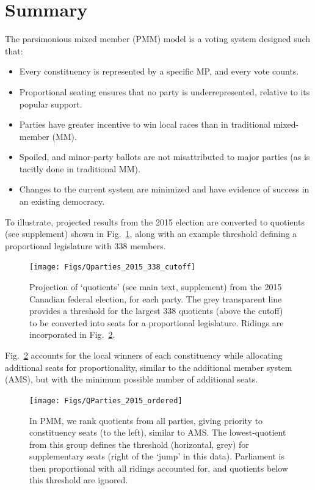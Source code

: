 \section*{Summary}
\renewcommand{\thefigure}{S-\arabic{figure}}

The parsimonious mixed member (PMM) model is a voting system designed such that:

\begin{itemize}
\item Every constituency is represented by a specific MP, and every vote counts. 
\item Proportional seating ensures that no party is underrepresented, relative to its popular support. 
\item Parties have greater incentive to win local races than in traditional mixed-member (MM).
\item Spoiled, and minor-party ballots are not misattributed to major parties (as is tacitly done in traditional MM).
\item Changes to the current system are minimized and have evidence of success in an existing democracy.
\end{itemize}

To illustrate, projected results from the 2015 election are converted to quotients (see supplement) shown in Fig.~\ref{fig:sumQParties-2015-338-cutoff}, along with an example threshold defining a proportional legislature with 338 members. 
\begin{figure}[h!]
  \texttt{[image: Figs/Qparties\_2015\_338\_cutoff]}
  \caption{Projection of `quotients' (see main text, supplement) from the 2015 Canadian federal election, for each party. The grey transparent line provides a threshold for the largest 338 quotients (above the cutoff) to be converted into seats for a proportional legislature. Ridings are incorporated in Fig.~\ref{fig:sumQParties-2015-ordered}. }
\label{fig:sumQParties-2015-338-cutoff}
\end{figure}

Fig.~\ref{fig:sumQParties-2015-ordered} accounts for the local winners of each constituency while allocating additional seats for proportionality, similar to the additional member system (AMS), but with the minimum possible number of additional seats.

\begin{figure}[h!]
\texttt{[image: Figs/QParties\_2015\_ordered]}
\caption{ In PMM, we rank quotients from all parties, giving priority to constituency seats (to the left), similar to AMS. The lowest-quotient from this group defines the threshold (horizontal, grey) for supplementary seats (right of the `jump' in this data). Parliament is then proportional with all ridings accounted for, and quotients below this threshold are ignored.}
\label{fig:sumQParties-2015-ordered}
\end{figure}

